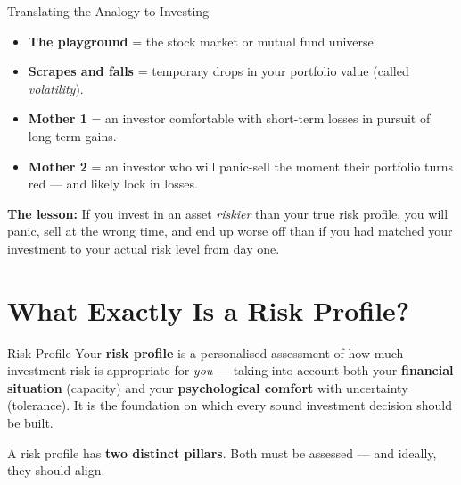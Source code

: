 \documentclass[12pt,a4paper]{article}
\begin{document}
\begin{examplebox}{Translating the Analogy to Investing}
\begin{itemize}
  \item \textbf{The playground} = the stock market or mutual fund universe.
  \item \textbf{Scrapes and falls} = temporary drops in your portfolio value (called \textit{volatility}).
  \item \textbf{Mother 1} = an investor comfortable with short-term losses in pursuit of long-term gains.
  \item \textbf{Mother 2} = an investor who will panic-sell the moment their portfolio turns red --- and likely lock in losses.
\end{itemize}

\medskip
\textbf{The lesson:} If you invest in an asset \textit{riskier} than your true risk profile, you will panic, sell at the wrong time, and end up worse off than if you had matched your investment to your actual risk level from day one.
\end{examplebox}

\section{What Exactly Is a Risk Profile?}

\begin{definitionbox}{Risk Profile}
Your \textbf{risk profile} is a personalised assessment of how much investment risk is appropriate for \textit{you} --- taking into account both your \textbf{financial situation} (capacity) and your \textbf{psychological comfort} with uncertainty (tolerance). It is the foundation on which every sound investment decision should be built.
\end{definitionbox}

\vspace{2mm}

A risk profile has \textbf{two distinct pillars}. Both must be assessed --- and ideally, they should align.

\begin{center}
\end{center}
\end{document}
